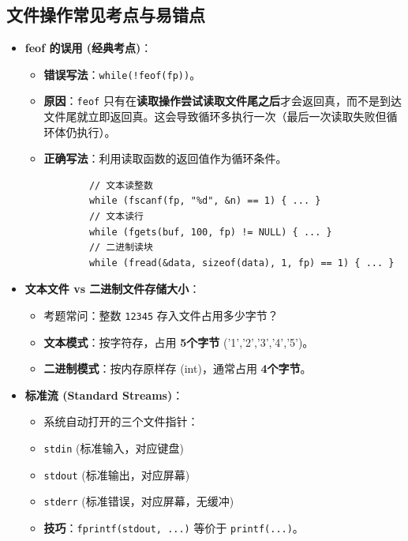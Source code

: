 \documentclass[a4paper,12pt]{article}
\begin{document}
\subsection{文件操作常见考点与易错点}
\begin{itemize}
    \item \textbf{feof 的误用 (经典考点)}：
    \begin{itemize}
        \item \textbf{错误写法}：\texttt{while(!feof(fp))}。
        \item \textbf{原因}：\texttt{feof} 只有在\textbf{读取操作尝试读取文件尾之后}才会返回真，而不是到达文件尾就立即返回真。这会导致循环多执行一次（最后一次读取失败但循环体仍执行）。
        \item \textbf{正确写法}：利用读取函数的返回值作为循环条件。
        \begin{lstlisting}
        // 文本读整数
        while (fscanf(fp, "%d", &n) == 1) { ... }
        // 文本读行
        while (fgets(buf, 100, fp) != NULL) { ... }
        // 二进制读块
        while (fread(&data, sizeof(data), 1, fp) == 1) { ... }
        \end{lstlisting}
    \end{itemize}
    
    \item \textbf{文本文件 vs 二进制文件存储大小}：
    \begin{itemize}
        \item 考题常问：整数 \texttt{12345} 存入文件占用多少字节？
        \item \textbf{文本模式}：按字符存，占用 \textbf{5个字节} ('1','2','3','4','5')。
        \item \textbf{二进制模式}：按内存原样存 (int)，通常占用 \textbf{4个字节}。
    \end{itemize}

    \item \textbf{标准流 (Standard Streams)}：
    \begin{itemize}
        \item 系统自动打开的三个文件指针：
        \item \texttt{stdin} (标准输入，对应键盘)
        \item \texttt{stdout} (标准输出，对应屏幕)
        \item \texttt{stderr} (标准错误，对应屏幕，无缓冲)
        \item \textbf{技巧}：\texttt{fprintf(stdout, ...)} 等价于 \texttt{printf(...)}。
    \end{itemize}


\end{itemize}
\end{document}

